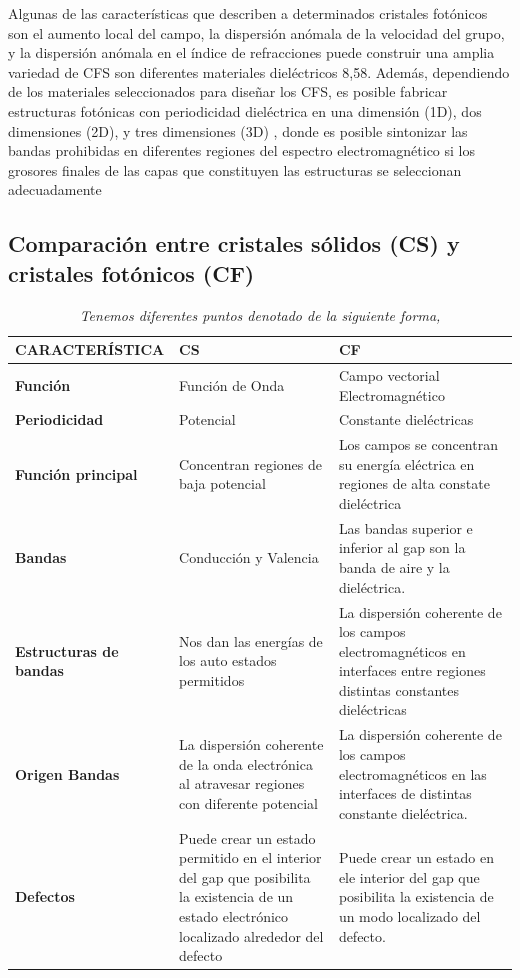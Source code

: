 \documentclass[a4paper,11pt,]{book}
\begin{document}
Algunas de las características que describen a determinados cristales fotónicos son el aumento local del campo, la dispersión anómala de la velocidad del grupo, y la dispersión anómala en el índice de refracciones puede construir una amplia variedad de CFS son diferentes materiales dieléctricos {8,58}. Además, dependiendo de los materiales seleccionados para diseñar los CFS, es posible fabricar estructuras fotónicas con periodicidad dieléctrica en una dimensión (1D), dos dimensiones (2D), y tres dimensiones (3D) , donde es posible sintonizar las bandas prohibidas en diferentes regiones del espectro electromagnético si los grosores finales de las capas que constituyen las estructuras se seleccionan adecuadamente    



\subsection{ Comparación entre cristales sólidos (CS) y cristales fotónicos (CF)}

\begin{table}[H]
	\centering
	\begin{tabular}{| m{4cm} | m{4cm} | m{4cm} |}
		\hline 
		\textbf{CARACTERÍSTICA} & \textbf{CS} & \textbf{CF} \\ 
		\hline 
		\textbf{Función} & Función de Onda & Campo vectorial Electromagnético \\ 
		\hline 
		\textbf{Periodicidad} & Potencial & Constante dieléctricas \\ 
		\hline 
		\textbf{Función principal} & Concentran regiones de baja potencial &  
		Los campos se concentran su energía  eléctrica en regiones de alta constate dieléctrica \\ 
		\hline 
		\textbf{Bandas} & Conducción y Valencia & Las bandas superior e inferior al gap son la banda de aire y la dieléctrica. \\ 
		\hline 
		\textbf{Estructuras de bandas} & Nos dan las energías de los auto estados permitidos & La dispersión coherente de los campos electromagnéticos en interfaces entre regiones distintas constantes dieléctricas \\ 
		\hline 
		\textbf{Origen Bandas} & La dispersión coherente de la onda electrónica al atravesar regiones con diferente potencial & La dispersión coherente de los campos electromagnéticos en las interfaces de distintas constante dieléctrica. \\ 
		\hline 
		\textbf{Defectos} & Puede crear un estado permitido en el interior del gap que posibilita la existencia de un estado electrónico localizado alrededor del defecto & Puede crear un estado en ele interior del gap que posibilita la existencia de un modo localizado del defecto. \\ 
		\hline 
	\end{tabular} 
	\caption{ \emph{Tenemos  diferentes puntos denotado de la siguiente forma,  }}
	\label{tabla:01}
\end{table}
\end{document}

